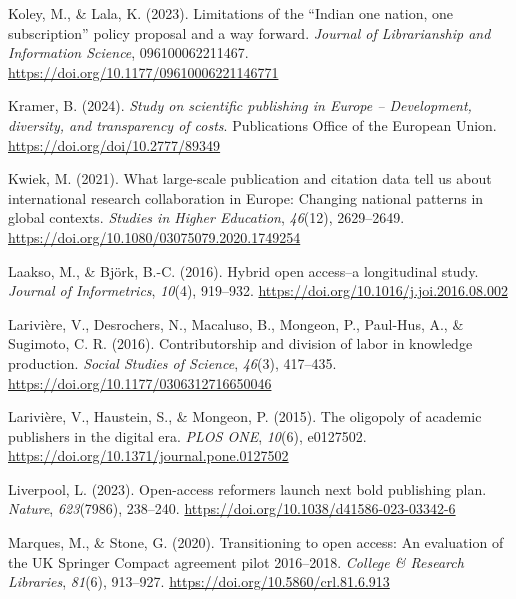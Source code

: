 \documentclass[a4paper,man,floatsintext,longtable,noextraspace,12pt]{apa6}
\newenvironment{CSLReferences}%
  {}%
  {\par}
\begin{document}
\begin{CSLReferences}{1}{0}
\leavevmode{}%
Koley, M., \& Lala, K. (2023). Limitations of the {{``Indian one nation,
one subscription''}} policy proposal and a way forward. \emph{Journal of
Librarianship and Information Science}, 096100062211467.
\url{https://doi.org/10.1177/09610006221146771}

\leavevmode{}%
Kramer, B. (2024). \emph{Study on scientific publishing in {Europe} --
{Development}, diversity, and transparency of costs}. Publications
Office of the European Union. \url{https://doi.org/doi/10.2777/89349}

\leavevmode{}%
Kwiek, M. (2021). What large-scale publication and citation data tell us
about international research collaboration in {Europe}: Changing
national patterns in global contexts. \emph{Studies in Higher
Education}, \emph{46}(12), 2629--2649.
\url{https://doi.org/10.1080/03075079.2020.1749254}

\leavevmode{}%
Laakso, M., \& Björk, B.-C. (2016). Hybrid open access--a longitudinal
study. \emph{Journal of Informetrics}, \emph{10}(4), 919--932.
\url{https://doi.org/10.1016/j.joi.2016.08.002}

\leavevmode{}%
Larivière, V., Desrochers, N., Macaluso, B., Mongeon, P., Paul-Hus, A.,
\& Sugimoto, C. R. (2016). Contributorship and division of labor in
knowledge production. \emph{Social Studies of Science}, \emph{46}(3),
417--435. \url{https://doi.org/10.1177/0306312716650046}

\leavevmode{}%
Larivière, V., Haustein, S., \& Mongeon, P. (2015). The oligopoly of
academic publishers in the digital era. \emph{{PLOS} {ONE}},
\emph{10}(6), e0127502.
\url{https://doi.org/10.1371/journal.pone.0127502}

\leavevmode{}%
Liverpool, L. (2023). Open-access reformers launch next bold publishing
plan. \emph{Nature}, \emph{623}(7986), 238--240.
\url{https://doi.org/10.1038/d41586-023-03342-6}

\leavevmode{}%
Marques, M., \& Stone, G. (2020). Transitioning to open access: An
evaluation of the {UK} {Springer Compact} agreement pilot 2016--2018.
\emph{College {\&} Research Libraries}, \emph{81}(6), 913--927.
\url{https://doi.org/10.5860/crl.81.6.913}


\end{CSLReferences}
\end{document}
